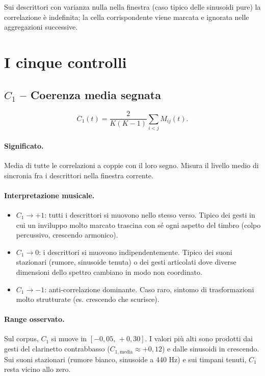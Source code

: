 \documentclass[a4paper,11pt]{article}
\begin{document}
Sui descrittori con varianza nulla nella finestra (caso tipico delle
sinusoidi pure) la correlazione è indefinita; la cella corrispondente
viene marcata e ignorata nelle aggregazioni successive.

\section{I cinque controlli}

\subsection{$C_1$ -- Coerenza media segnata}

\formula
\[
C_1(t) = \frac{2}{K(K-1)} \sum_{i < j} M_{ij}(t).
\]

\paragraph{Significato.}
Media di tutte le correlazioni a coppie con il loro segno. Misura il
livello medio di sincronia fra i descrittori nella finestra corrente.

\paragraph{Interpretazione musicale.}
\begin{itemize}[nosep]
  \item $C_1 \to +1$: tutti i descrittori si muovono nello stesso verso.
        Tipico dei gesti in cui un inviluppo molto marcato trascina con sé
        ogni aspetto del timbro (colpo percussivo, crescendo armonico).
  \item $C_1 \to 0$: i descrittori si muovono indipendentemente.
        Tipico dei suoni stazionari (rumore, sinusoide tenuta) o dei
        gesti articolati dove diverse dimensioni dello spettro
        cambiano in modo non coordinato.
  \item $C_1 \to -1$: anti-correlazione dominante. Caso raro, sintomo
        di trasformazioni molto strutturate (es. crescendo che scurisce).
\end{itemize}

\paragraph{Range osservato.}
Sul corpus, $C_1$ si muove in $[-0{,}05,\, +0{,}30]$. I valori più alti
sono prodotti dai gesti del clarinetto contrabbasso ($C_{1,\text{media}}
\approx +0{,}12$) e dalle sinusoidi in crescendo. Sui suoni stazionari
(rumore bianco, sinusoide a 440 Hz) e sui timpani tenuti, $C_1$ resta
vicino allo zero.
\end{document}
